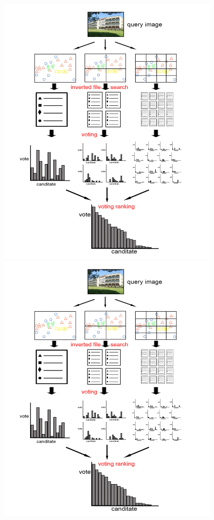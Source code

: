 \begin{figure}[!htbp]
  \begin{center}
    \leavevmode
    \ifpdf
      \includegraphics[scale=0.25]{queryProcess}
    \else
      \includegraphics[scale=0.25]{queryProcess}

\end{center}
\end{figure}
